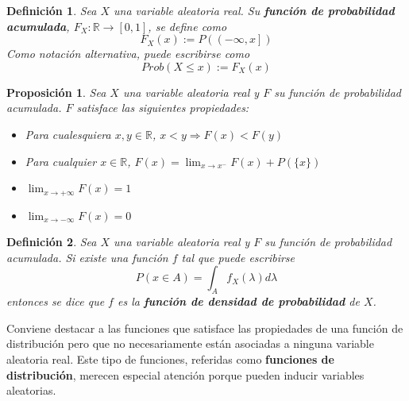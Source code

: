 \documentclass[12pt,letterpaper,draft]{book}
\newtheorem{definicion}{Definición}[chapter]
\newtheorem{proposicion}[teorema]{Proposición}
\newcommand{\R}{\mathbb{R}}
\begin{document}

\begin{definicion}%
Sea $X$ una variable aleatoria real. Su \textbf{función de probabilidad acumulada}, $F_X : \R \rightarrow [0,1]$, se define como
\begin{equation*}
F_X (x) := P\left( \left(-\infty,x \right] \right)
\end{equation*}
Como notación alternativa, puede escribirse como
\begin{equation}
Prob(X\leq x) := F_X(x) 
\end{equation}
\end{definicion}

\begin{proposicion}
Sea $X$ una variable aleatoria real y $F$ su función de probabilidad acumulada. $F$ satisface las siguientes propiedades:
\begin{itemize}
\item Para cualesquiera $x,y\in \R$, $x < y \Rightarrow F(x) < F(y)$
\item Para cualquier $x\in\R$, $F(x) = \lim_{x\rightarrow x^{-}} F(x) + P(\{x\})$
\item $\lim_{x\rightarrow +\infty} F(x) = 1$
\item $\lim_{x\rightarrow -\infty} F(x) = 0$
\end{itemize}
\end{proposicion}

\begin{definicion}
Sea $X$ una variable aleatoria real y $F$ su función de probabilidad acumulada. Si existe una función $f$  tal que puede escribirse
\begin{equation}
P(x\in A) = \int_A f_X(\lambda) d\lambda 
\end{equation}
entonces se dice que $f$ es la \textbf{función de densidad de probabilidad} de $X$.
\end{definicion}

Conviene destacar a las funciones que satisface las propiedades de una función de distribución pero que no necesariamente están asociadas a ninguna variable aleatoria real.
%
Este tipo de funciones, referidas como \textbf{funciones de distribución}, merecen especial atención porque pueden inducir variables aleatorias.
\end{document}
